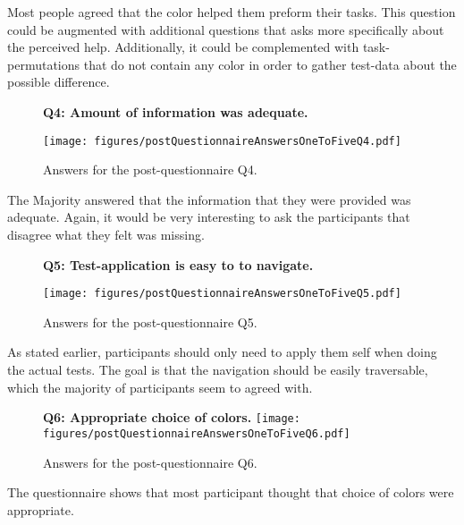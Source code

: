     Most people agreed that the color helped them preform their tasks.
    This question could be augmented with additional questions that asks
    more specifically about the perceived help. Additionally, it could be
    complemented with task-permutations that do not contain any color
    in order to gather test-data about the possible difference.

    \newpage
    \begin{figure}[h!]
      \textbf{Q4: Amount of information was adequate.}
      \begin{center}
        \texttt{[image: figures/postQuestionnaireAnswersOneToFiveQ4.pdf]}
        \vspace{-1cm}
        \caption{Answers for the post-questionnaire Q4.}
      \end{center}
    \end{figure}

    The Majority answered that the information that they were provided was
    adequate. Again, it would be very interesting to ask the participants
    that disagree what they felt was missing.

    \begin{figure}[h!]
      \textbf{Q5: Test-application is easy to to navigate.}
      \begin{center}
        \texttt{[image: figures/postQuestionnaireAnswersOneToFiveQ5.pdf]}
        \vspace{-1cm}
        \caption{Answers for the post-questionnaire Q5.}
      \end{center}
    \end{figure}

    As stated earlier, participants should only need to apply them self
    when doing the actual tests. The goal is that the navigation should be
    easily traversable, which the majority of participants seem to agreed with.

    \begin{figure}[h!]
      \begin{center}
        \textbf{Q6: Appropriate choice of colors.}
        \texttt{[image: figures/postQuestionnaireAnswersOneToFiveQ6.pdf]}
        \vspace{-1cm}
        \caption{Answers for the post-questionnaire Q6.}
      \end{center}
    \end{figure}

    The questionnaire shows that most participant thought that choice of
    colors were appropriate.

